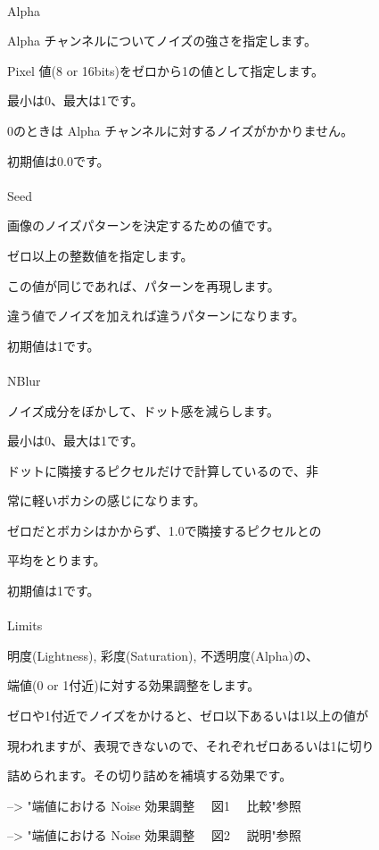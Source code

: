 \documentclass[a4paper,12pt]{article}
\begin{document}
\newpage

\thispagestyle{empty}

\ \vspace{-0.2em}
\par
\noindent Alpha\par
Alpha チャンネルについてノイズの強さを指定します。\par
Pixel 値(8 or 16bits)をゼロから1の値として指定します。\par
最小は0、最大は1です。\par
0のときは Alpha チャンネルに対するノイズがかかりません。\par
初期値は0.0です。\\
\\
Seed\par
画像のノイズパターンを決定するための値です。\par
ゼロ以上の整数値を指定します。\par
この値が同じであれば、パターンを再現します。\par
違う値でノイズを加えれば違うパターンになります。\par
初期値は1です。\\
\\
NBlur\par
ノイズ成分をぼかして、ドット感を減らします。\par
最小は0、最大は1です。\par
ドットに隣接するピクセルだけで計算しているので、非\par
常に軽いボカシの感じになります。\par
ゼロだとボカシはかからず、1.0で隣接するピクセルとの\par
平均をとります。\par
初期値は1です。\\
\\
Limits\par
明度(Lightness), 彩度(Saturation), 不透明度(Alpha)の、\par
端値(0 or 1付近)に対する効果調整をします。\par
ゼロや1付近でノイズをかけると、ゼロ以下あるいは1以上の値が\par
現われますが、表現できないので、それぞれゼロあるいは1に切り\par
詰められます。その切り詰めを補填する効果です。\par
--> "端値における Noise 効果調整 \ \ 図1 \ \ 比較"参照\par
--> "端値における Noise 効果調整 \ \ 図2 \ \ 説明"参照\\
\end{document}
